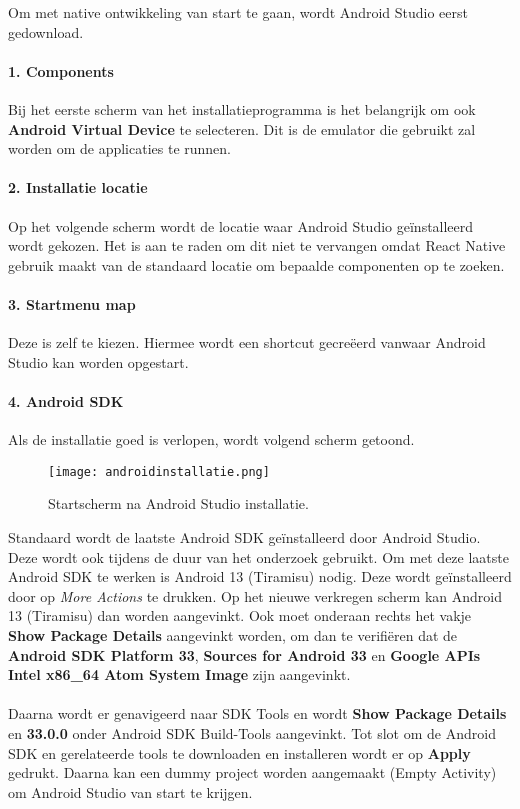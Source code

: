 Om met native ontwikkeling van start te gaan, wordt Android Studio eerst gedownload. 

\paragraph{1. Components}
Bij het eerste scherm van het installatieprogramma is het belangrijk om ook 
\textbf{Android Virtual Device} te selecteren. Dit is de emulator die gebruikt 
zal worden om de applicaties te runnen.

\paragraph{2. Installatie locatie}
Op het volgende scherm wordt de locatie waar Android Studio geïnstalleerd wordt gekozen. 
Het is aan te raden om dit niet te vervangen omdat React Native gebruik maakt van de standaard 
locatie om bepaalde componenten op te zoeken. 

\paragraph{3. Startmenu map}
Deze is zelf te kiezen. Hiermee wordt een shortcut gecreëerd vanwaar Android Studio kan worden opgestart.

\paragraph{4. Android SDK}\label{par:sdk}
Als de installatie goed is verlopen, wordt volgend scherm getoond. 
\begin{figure}[H]
    \centering
    \texttt{[image: androidinstallatie.png]}
    \caption{Startscherm na Android Studio installatie.}
\end{figure}
Standaard wordt de laatste Android SDK geïnstalleerd door Android Studio. 
Deze wordt ook tijdens de duur van het onderzoek gebruikt. 
Om met deze laatste Android SDK te werken is Android 13 (Tiramisu) nodig. 
Deze wordt geïnstalleerd door op \textit{More Actions} te drukken. Op het nieuwe verkregen scherm 
kan Android 13 (Tiramisu) dan worden aangevinkt. Ook moet onderaan rechts het vakje 
\textbf{Show Package Details} aangevinkt worden, om dan te verifiëren dat de 
\textbf{Android SDK Platform 33}, \textbf{Sources for Android 33} en 
\textbf{Google APIs Intel x86\_64 Atom System Image} zijn aangevinkt.
\\\\
Daarna wordt er genavigeerd naar SDK Tools en wordt \textbf{Show Package Details} 
en \textbf{33.0.0} onder Android SDK Build-Tools aangevinkt. 
Tot slot om de Android SDK en gerelateerde tools te downloaden en installeren wordt er op \textbf{Apply} gedrukt.
Daarna kan een dummy project worden aangemaakt (Empty Activity) om Android Studio van start te krijgen.


